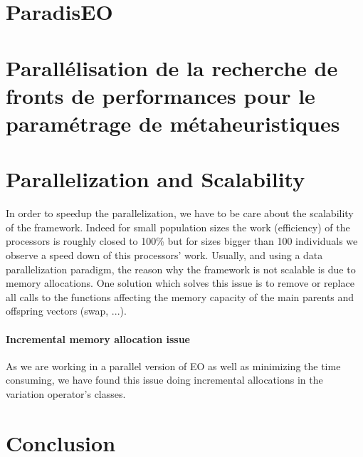 \section{ParadisEO}


\section{}

\section{}

\section{Parallélisation de la recherche de fronts de performances pour le paramétrage de métaheuristiques}

\section{}

\section{Parallelization and Scalability}

In order to speedup the parallelization, we have to be care about the scalability of the framework. Indeed for small population sizes the work (efficiency) of the processors is roughly closed to 100\% but for sizes bigger than 100 individuals we observe a speed down of this processors' work. Usually, and using a data parallelization paradigm, the reason why the framework is not scalable is due to memory allocations. One solution which solves this issue is to remove or replace all calls to the functions affecting the memory capacity of the main parents and offspring vectors (swap, ...).

\paragraph{Incremental memory allocation issue}

As we are working in a parallel version of EO as well as minimizing the time consuming, we have found this issue doing incremental allocations in the variation operator's classes.

\section{Conclusion}


